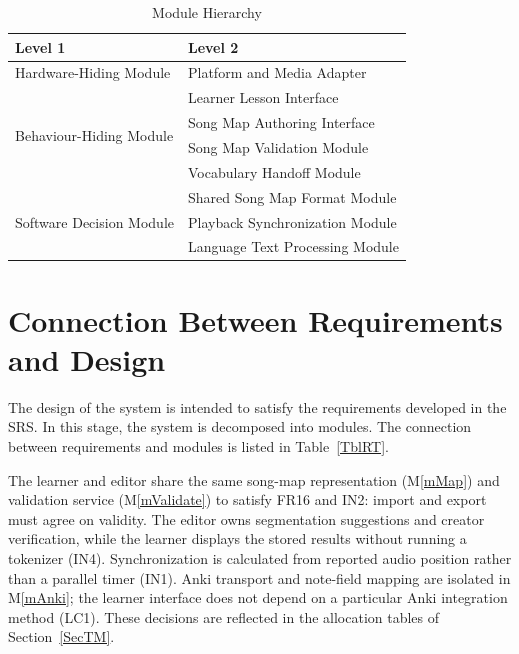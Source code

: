 \documentclass[12pt, titlepage]{article}
\newcommand{\mref}[1]{M\ref{#1}}
\begin{document}
\begin{table}[h!]
\centering
\begin{tabular}{p{} p{}}
\toprule
\textbf{Level 1} & \textbf{Level 2}\\
\midrule

\multirow{1}{0.3\textwidth}{Hardware-Hiding Module} & Platform and Media Adapter\\
\midrule

\multirow{4}{0.3\textwidth}{Behaviour-Hiding Module} & Learner Lesson Interface\\
& Song Map Authoring Interface\\
& Song Map Validation Module\\
& Vocabulary Handoff Module\\
\midrule

\multirow{3}{0.3\textwidth}{Software Decision Module} & Shared Song Map Format Module\\
& Playback Synchronization Module\\
& Language Text Processing Module\\
\bottomrule

\end{tabular}
\caption{Module Hierarchy}
\label{TblMH}
\end{table}

\section{Connection Between Requirements and Design} \label{SecConnection}

The design of the system is intended to satisfy the requirements developed in
the SRS. In this stage, the system is decomposed into modules. The connection
between requirements and modules is listed in Table~\ref{TblRT}.

The learner and editor share the same song-map representation
(\mref{mMap}) and validation service (\mref{mValidate}) to satisfy
FR16 and IN2: import and export must agree on validity. The editor
owns segmentation suggestions and creator verification, while the
learner displays the stored results without running a tokenizer (IN4).
Synchronization is calculated from reported audio position rather than
a parallel timer (IN1). Anki transport and note-field mapping are
isolated in \mref{mAnki}; the learner interface does not depend on a
particular Anki integration method (LC1). These decisions are
reflected in the allocation tables of Section~\ref{SecTM}.
\end{document}
